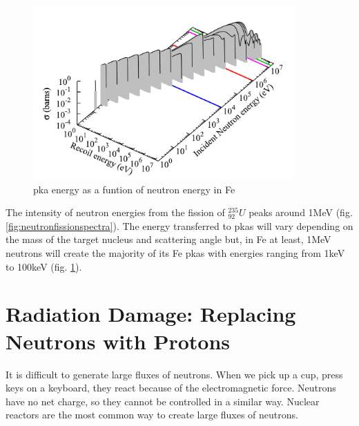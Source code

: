 \begin{figure}[htbp]
  \begin{center}
    \includegraphics[width=10.0cm]{chapters/introduction/plots/damage/pkaenergy.png}
    \caption{\acrshort{pka} energy as a funtion of neutron energy in Fe\cite{pkaenergyspectra}}
    \label{fig:neutronironrecoil}
  \end{center}
\end{figure}

The intensity of neutron energies from the fission of ${}^{235}_{92}U$ peaks around 1MeV (fig. \ref{fig:neutronfissionspectra}).  The energy transferred to \acrshort{pka}s will vary depending on the mass of the target nucleus and scattering angle but, in Fe at least, 1MeV neutrons will create the majority of its Fe \acrshort{pka}s with energies ranging from 1keV to 100keV (fig. \ref{fig:neutronironrecoil}).








\FloatBarrier
\section{Radiation Damage: Replacing Neutrons with Protons}

It is difficult to generate large fluxes of neutrons.  When we pick up a cup, press keys on a keyboard, they react because of the electromagnetic force.  Neutrons have no net charge, so they cannot be controlled in a similar way.  Nuclear reactors are the most common way to create large fluxes of neutrons.

